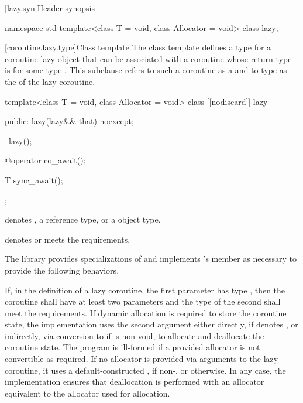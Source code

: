 {[lazy.syn]{Header  synopsis}
\begin{codeblock}
namespace std {
  template<class T = void, class Allocator = void>
  class lazy;
}
\end{codeblock}

[coroutine.lazy.type]{Class template }
\pnum
The class template  defines
a type for a coroutine lazy object
that can be associated with
a coroutine whose return type is
 for some type .
This subclause refers to such a coroutine as a 
and to type  as the  of the lazy coroutine.

\begin{codeblock}
template<class T = void, class Allocator = void>
  class [[nodiscard]] lazy {
  public:
    lazy(lazy&& that) noexcept;

    ~lazy();

    @\unspec@ operator co_await();

    T sync_await();
  };
\end{codeblock}

\pnum
\mandates
{} denotes , a reference type, or
a  object type.

\pnum
\expects
{} denotes  or meets
the  requirements.

\pnum
The library provides specializations of 
and implements 's member 
as necessary to provide the following behaviors.

\pnum
If, in the definition of a lazy coroutine,
the first parameter has type , then
the coroutine shall have at least two parameters
and the type of the second shall meet
the  requirements.
If dynamic allocation is required to store
the coroutine state,
the implementation uses the second argument either directly,
if  denotes ,
or indirectly, via conversion to 
if  is non-void,
to allocate and deallocate the coroutine state.
The program is ill-formed if a provided allocator is not convertible as required.
If no allocator is provided via arguments to the lazy coroutine,
it uses a default-constructed , if non-, or
 otherwise.
In any case, the implementation ensures that
deallocation is performed with an allocator
equivalent to the allocator used for allocation.

}
